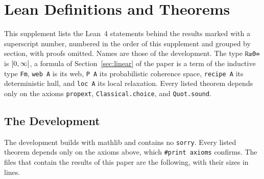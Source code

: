 \section{Lean Definitions and Theorems}
\label{app:lean}

This supplement lists the Lean~4 statements behind the results marked
with a superscript number, numbered in the order of this supplement and grouped by
section, with proofs omitted. Names are those of the development. The type
\lstinline{ℝ≥0∞} is $[0,\infty]$, a formula of
Section~\ref*{sec:linear} of the paper is a term of the inductive type \lstinline{Fm},
\lstinline{web A} is its web, \lstinline{P A} its probabilistic coherence
space, \lstinline{recipe A} its deterministic hull, and \lstinline{loc A} its local
relaxation. Every listed theorem depends only on the axioms
\lstinline{propext}, \lstinline{Classical.choice}, and
\lstinline{Quot.sound}.

\subsection{The Development}

The development builds with \textsf{mathlib} and contains no
\texttt{sorry}. Every listed theorem depends only on the axioms above,
which \texttt{\#print axioms} confirms. The files that contain the
results of this paper are the following, with their sizes in lines.

